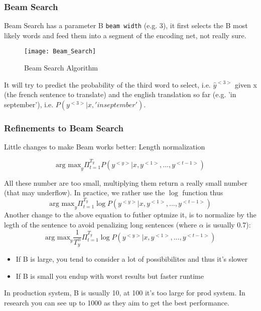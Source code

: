 \subsubsection{Beam Search}
Beam Search has a parameter B \texttt{beam width} (e.g. 3), it first selects the B most likely words and feed them into a segment of the encoding net, not really sure.

\begin{figure}[H]
\centering
\texttt{[image: Beam\_Search]}
\caption{Beam Search Algorithm}
\end{figure}
It will try to predict the probability of the third word to select, i.e. $\hat{y}^{<3>}$ given x (the french sentence to translate) and the english translation so far (e.g. 'in september'), i.e. $P(y^{<3>} | x, 'in september')$.

\subsubsection{Refinements to Beam Search}
Little changes to make Beam works better:
Length normalization

\begin{equation*}
\text{arg max}_{y} \Pi^{T_y}_{t=1} P(y^{<y>} | x, y^{<1>}, ..., y^{<t-1>})
\end{equation*}

All these number are too small, multiplying them return a really small number (that may underflow). In practice, we rather use the $\log$ function thus
\begin{equation*}
\text{arg max}_{y} \Pi^{T_y}_{t=1} \log P(y^{<y>} | x, y^{<1>}, ..., y^{<t-1>})
\end{equation*}
Another change to the above equation to futher optmize it, is to normalize by the legth of the sentence to avoid penalizing long sentences (where $\alpha$ is usually 0.7):
\begin{equation*}
\text{arg max}_{y} \frac{1}{T^{\alpha}_y} \Pi^{T_y}_{t=1} \log P(y^{<y>} | x, y^{<1>}, ..., y^{<t-1>})
\end{equation*}

\begin{itemize}
    \item If B is large, you tend to consider a lot of possibibilites and thus it's slower
    \item If B is small you endup with worst results but faster runtime
\end{itemize}
In production system, B is usually 10, at 100 it's too large for prod system. In research you can see up to 1000 as they aim to get the best performance.

